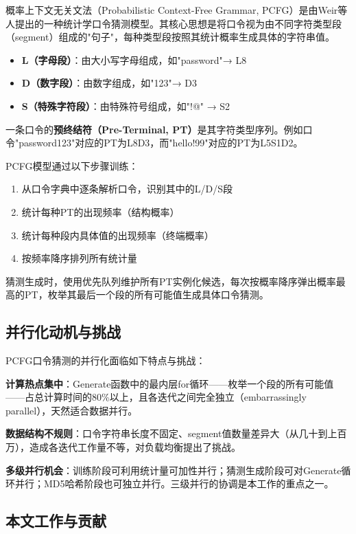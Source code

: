 \documentclass[12pt,a4paper]{ctexart}
\begin{document}
概率上下文无关文法（Probabilistic Context-Free Grammar, PCFG）是由Weir等人\cite{weir2009}提出的一种统计学口令猜测模型。其核心思想是将口令视为由不同字符类型段（segment）组成的"句子"，每种类型段按照其统计概率生成具体的字符串值。

\begin{itemize}[nosep]
    \item \textbf{L（字母段）}：由大小写字母组成，如"password"→ L8
    \item \textbf{D（数字段）}：由数字组成，如"123"→ D3
    \item \textbf{S（特殊字符段）}：由特殊符号组成，如"!@" → S2
\end{itemize}

一条口令的\textbf{预终结符（Pre-Terminal, PT）}是其字符类型序列。例如口令"password123"对应的PT为L8D3，而"hello!99"对应的PT为L5S1D2。

PCFG模型通过以下步骤训练：
\begin{enumerate}[nosep]
    \item 从口令字典中逐条解析口令，识别其中的L/D/S段
    \item 统计每种PT的出现频率（结构概率）
    \item 统计每种段内具体值的出现频率（终端概率）
    \item 按频率降序排列所有统计量
\end{enumerate}

猜测生成时，使用优先队列维护所有PT实例化候选，每次按概率降序弹出概率最高的PT，枚举其最后一个段的所有可能值生成具体口令猜测。

\subsection{并行化动机与挑战}

PCFG口令猜测的并行化面临如下特点与挑战：

\textbf{计算热点集中}：Generate函数中的最内层for循环——枚举一个段的所有可能值——占总计算时间的80\%以上，且各迭代之间完全独立（embarrassingly parallel），天然适合数据并行。

\textbf{数据结构不规则}：口令字符串长度不固定、segment值数量差异大（从几十到上百万），造成各迭代工作量不等，对负载均衡提出了挑战。

\textbf{多级并行机会}：训练阶段可利用统计量可加性并行；猜测生成阶段可对Generate循环并行；MD5哈希阶段也可独立并行。三级并行的协调是本工作的重点之一。

\subsection{本文工作与贡献}
\end{document}
